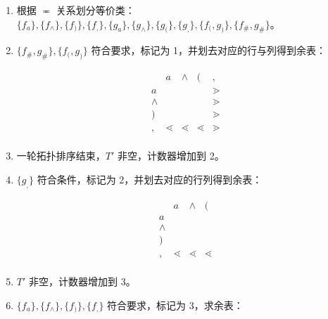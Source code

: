 \begin{enumerate}
\begin{enumerate}
\begin{enumerate}
            \item 根据 $\eqcirc$ 关系划分等价类：$\{f_a\}, \{f_\wedge\}, \{f_)\}, \{f_,\}, \{g_a\}, \{g_\wedge\}, \{g_(\}, \{g_,\}, \{f_(, g_)\}, \{f_\#, g_\#\}$。
            
            \item $\{f_\#, g_\#\}, \{f_(, g_)\}$ 符合要求，标记为 1，并划去对应的行与列得到余表：

            \begin{equation*}
                \begin{array}{c|cccc}
                      & a & \wedge & ( & , \\
                    \hline
                    a & & &  & \gtrdot \\
                    \wedge & & & & \gtrdot \\
                    ) & & & & \gtrdot \\
                    , & \lessdot & \lessdot & \lessdot & \gtrdot \\
                \end{array}
            \end{equation*}
            
            \item 一轮拓扑排序结束，$T'$ 非空，计数器增加到 2。
            
            \item $\{g_,\}$ 符合条件，标记为 2，并划去对应的行列得到余表：
            
            \begin{equation*}
                \begin{array}{c|ccc}
                      & a & \wedge & ( \\
                    \hline
                    a & & & \\
                    \wedge & & & \\
                    ) & & & \\
                    , & \lessdot & \lessdot & \lessdot \\
                \end{array}
            \end{equation*}
            
            \item $T'$ 非空，计数器增加到 3。
            
            \item $\{f_a\}, \{f_\wedge\}, \{f_)\}, \{f_,\}$ 符合要求，标记为 3，求余表：
            

\end{enumerate}
\end{enumerate}
\end{enumerate}
